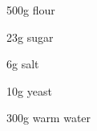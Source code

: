 \begin{ingredients}
	\item 500g flour
	\item 23g sugar
	\item 6g salt
	\item 10g yeast
	\item 300g warm water
\end{ingredients}


